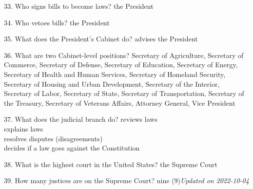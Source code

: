 \documentclass[avery5371,frame]{flashcards}
\begin{document}
        \begin{flashcard}{33. Who signs bills to become laws?}
        {the President}
        \end{flashcard}
        \begin{flashcard}{34. Who vetoes bills?}
        {the President}
        \end{flashcard}
        \begin{flashcard}{35. What does the President’s Cabinet do?}
        {advises the President}
        \end{flashcard}
        \begin{flashcard}{36. What are two Cabinet-level positions?}
        {Secretary of Agriculture\footnotesize, Secretary of Commerce\footnotesize, Secretary of Defense\footnotesize, Secretary of Education\footnotesize, Secretary of Energy\footnotesize, Secretary of Health and Human Services\footnotesize, Secretary of Homeland Security\footnotesize, Secretary of Housing and Urban Development\footnotesize, Secretary of the Interior\footnotesize, Secretary of Labor\footnotesize, Secretary of State\footnotesize, Secretary of Transportation\footnotesize, Secretary of the Treasury\footnotesize, Secretary of Veterans Affairs\footnotesize, Attorney General\footnotesize, Vice President}
        \end{flashcard}
        \begin{flashcard}{37. What does the judicial branch do?}
        {reviews laws\\explains laws\\resolves disputes (disagreements)\\decides if a law goes against the Constitution}
        \end{flashcard}
        \begin{flashcard}{38. What is the highest court in the United States?}
        {the Supreme Court}
        \end{flashcard}
        \begin{flashcard}{39. How many justices are on the Supreme Court?}
        {nine (9){\footnotesize{\textsl{Updated on 2022-10-04}}}}
        \end{flashcard}
\end{document}
